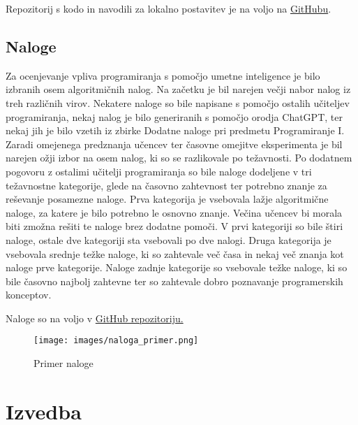 \documentclass[a4paper,12pt,openright]{book}
\begin{document}
Repozitorij s kodo in navodili za lokalno postavitev je na voljo na \href{https://github.com/spin311/hiter-inzeniring-diploma}{GitHubu}. 

\subsection{Naloge}
Za ocenjevanje vpliva programiranja s pomočjo umetne inteligence je bilo izbranih osem algoritmičnih nalog.
Na začetku je bil narejen večji nabor nalog iz treh različnih virov. Nekatere naloge so bile napisane s pomočjo ostalih učiteljev programiranja, nekaj nalog je bilo generiranih s pomočjo orodja ChatGPT, ter nekaj jih je bilo vzetih iz zbirke Dodatne naloge pri predmetu Programiranje I. \cite{dodatneNaloge}
Zaradi omejenega predznanja učencev ter časovne omejitve eksperimenta je bil narejen ožji izbor na osem nalog, ki so se razlikovale po težavnosti. Po dodatnem pogovoru z ostalimi učitelji programiranja so bile naloge dodeljene v tri težavnostne kategorije, glede na časovno zahtevnost ter potrebno znanje za reševanje posamezne naloge. Prva kategorija je vsebovala lažje algoritmične naloge, za katere je bilo potrebno le osnovno znanje. Večina učencev bi morala biti zmožna rešiti te naloge brez dodatne pomoči. V prvi kategoriji so bile štiri naloge, ostale dve kategoriji sta vsebovali po dve nalogi. Druga kategorija je vsebovala srednje težke naloge, ki so zahtevale več časa  in nekaj več znanja kot naloge prve kategorije. Naloge zadnje kategorije so vsebovale težke naloge, ki so bile časovno najbolj zahtevne ter so zahtevale dobro poznavanje programerskih konceptov.  


Naloge so na voljo v  \href{https://github.com/spin311/hiter-inzeniring-diploma/tree/main/naloge}{GitHub repozitoriju.}

\begin{figure}[H]
    \centering
    \texttt{[image: images/naloga\_primer.png]}
    \caption{Primer naloge}
    \label{fig:enter-label}
\end{figure}

\section{Izvedba}
\end{document}
